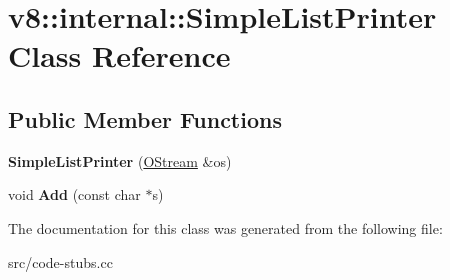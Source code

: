 \hypertarget{classv8_1_1internal_1_1_simple_list_printer}{}\section{v8\+:\+:internal\+:\+:Simple\+List\+Printer Class Reference}
\label{classv8_1_1internal_1_1_simple_list_printer}
\subsection*{Public Member Functions}
\begin{DoxyCompactItemize}
\item 
\hypertarget{classv8_1_1internal_1_1_simple_list_printer_a8f933b321fa76f7dfd867a08475c0b70}{}{\bfseries Simple\+List\+Printer} (\hyperlink{classv8_1_1internal_1_1_o_stream}{O\+Stream} \&os)\label{classv8_1_1internal_1_1_simple_list_printer_a8f933b321fa76f7dfd867a08475c0b70}

\item 
\hypertarget{classv8_1_1internal_1_1_simple_list_printer_aeca9e360c2ea02e770f36878320a4d42}{}void {\bfseries Add} (const char $\ast$s)\label{classv8_1_1internal_1_1_simple_list_printer_aeca9e360c2ea02e770f36878320a4d42}

\end{DoxyCompactItemize}


The documentation for this class was generated from the following file\+:\begin{DoxyCompactItemize}
\item 
src/code-\/stubs.\+cc\end{DoxyCompactItemize}

